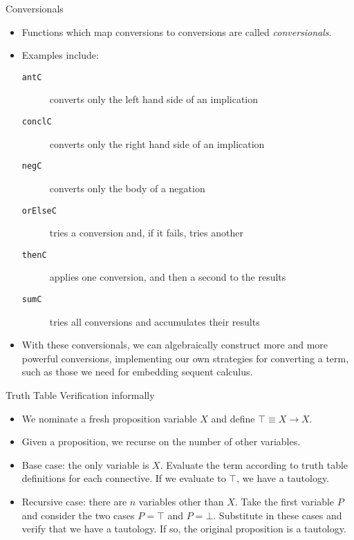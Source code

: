 \documentclass[presentation]{beamer}
\begin{document}
\begin{frame}[fragile,label={sec:orgheadline26}]{Conversionals}
 \begin{itemize}
\item Functions which map conversions to conversions are called \emph{conversionals}.
\item Examples include:
\begin{description}
\item[{\texttt{antC}}] converts only the left hand side of an implication
\item[{\texttt{conclC}}] converts only the right hand side of an implication
\item[{\texttt{negC}}] converts only the body of a negation
\item[{\texttt{orElseC}}] tries a conversion and, if it fails, tries another
\item[{\texttt{thenC}}] applies one conversion, and then a second to the results
\item[{\texttt{sumC}}] tries all conversions and accumulates their results
\end{description}

\item With these conversionals, we can algebraically construct more and more powerful
conversions, implementing our own strategies for converting a term, such as those
we need for embedding sequent calculus.
\end{itemize}
\end{frame}

\begin{frame}[label={sec:orgheadline27}]{Truth Table Verification informally}
\begin{itemize}
\item We nominate a fresh proposition variable \(X\) and define 
\(\top \equiv X \rightarrow X\).
\item Given a proposition, we recurse on the number of other variables.
\item Base case: the only variable is \(X\). Evaluate the term according to truth table
definitions for each connective. If we evaluate to \(\top\), we have a tautology.
\item Recursive case: there are \(n\) variables other than \(X\). Take the first variable
\(P\) and consider the two cases \(P = \top\) and \(P = \bot\). Substitute in these
cases and verify that we have a tautology. If so, the original proposition is a
tautology.
\end{itemize}
\end{frame}
\end{document}
